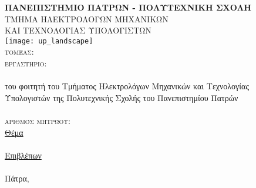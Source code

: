 \begin{titlepage}
\begin{center}
\textsc{\textbf{\large ΠΑΝΕΠΙΣΤΗΜΙΟ ΠΑΤΡΩΝ - ΠΟΛΥΤΕΧΝΙΚΗ ΣΧΟΛΗ}\\
\large ΤΜΗΜΑ ΗΛΕΚΤΡΟΛΟΓΩΝ ΜΗΧΑΝΙΚΩΝ\\ΚΑΙ ΤΕΧΝΟΛΟΓΙΑΣ ΥΠΟΛΟΓΙΣΤΩΝ}\\

\texttt{[image: up\_landscape]}\\  

\textsc{\Large τομέας: \division \\
εργαστήριο: \lab }\\[1cm]

\textsc{\uline{\LARGE{\shortdoctitle }}}\\ [0.5cm]
του φοιτητή του Τμήματος Ηλεκτρολόγων Μηχανικών και Τεχνολογίας\\
Υπολογιστών της Πολυτεχνικής Σχολής  του Πανεπιστημίου Πατρών\\[1cm]

\textsc{\LARGE \me }\\[0.5cm]
\textsc{\Large αριθμός μητρώου: \studnum}\\[1cm]

\uline{\large Θέμα}\\[0.5cm]
\textbf{\large \doctitle }\\[1cm]
\uline{\large Επιβλέπων}\\[0.5cm]
\large \suptitle \, \supname \\[1cm]
\vfill
\large{Πάτρα, \monthyear}
\end{center}
\end{titlepage}